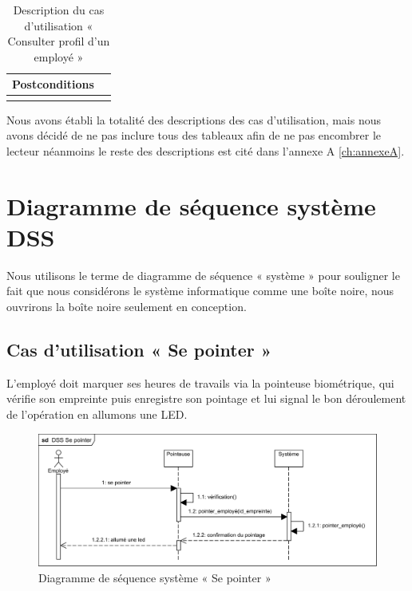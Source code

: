 \begin{longtable}{|p{4cm}|p{12cm}|}
                        \\
                        
                        \hline
                        Postconditions &   \\
                        \hline
                    \hline
                    \caption{Description du cas d'utilisation « Consulter profil d'un employé »}\\
            \end{longtable}        
            
            
    Nous avons établi la totalité des descriptions des cas d’utilisation, mais nous avons décidé de ne pas inclure tous des tableaux afin de ne pas encombrer le lecteur néanmoins le reste des descriptions est cité dans l’annexe A  \ref{ch:annexeA}.  
    
                
\section{Diagramme de séquence système DSS}
Nous utilisons le terme de diagramme de séquence « système » pour souligner le fait que nous considérons le système informatique comme une boîte noire, nous ouvrirons la boîte noire seulement en conception.\cite{5}
    
    \subsection{Cas d'utilisation « Se pointer »}
    L’employé doit marquer ses heures de travails via la pointeuse biométrique, qui vérifie son empreinte puis enregistre son pointage et lui signal le bon déroulement de l’opération en allumons une LED.
    \clearpage
        \begin{figure}[h!]
             \centering
            \includegraphics[scale=0.9]{images/DSS/DSS Se pointer.png}
             \caption{Diagramme de séquence système « Se pointer »}
             \label{fig4}
        \end{figure}
    \vspace{-30pt}
